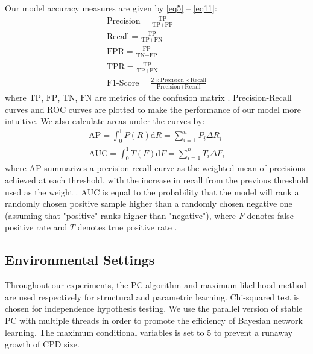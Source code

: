 \documentclass[journal,twoside]{IEEEtran}
\begin{document}
Our model accuracy measures are given by \eqref{eq5} -- \eqref{eq11}: 
\begin{gather}
    \text{Precision} = \displaystyle\frac{\text{TP}}{\text{TP} + \text{FP}}\label{eq5} \\
    \text{Recall} = \displaystyle\frac{\text{TP}}{\text{TP} + \text{FN}}\label{eq6} \\
    \text{FPR} = \displaystyle\frac{\text{FP}}{\text{TN} + \text{FP}}\label{eq7} \\
    \text{TPR} = \displaystyle\frac{\text{TP}}{\text{TP} + \text{FN}}\label{eq8} \\
    \text{F1-Score} = \displaystyle\frac{2 \times \text{Precision} \times \text{Recall}}{\text{Precision} + \text{Recall}}\label{eq9}
\end{gather}
where $\text{TP}$, $\text{FP}$, $\text{TN}$, $\text{FN}$ are metrics of the confusion matrix \cite{stehman1997selecting}. Precision-Recall curves and ROC curves \cite{powers2020evaluation}\cite{fawcett2006introduction} are plotted to make the performance of our model more intuitive. We also calculate areas under the curves by: 
\begin{gather}
    \text{AP} = \int_0^1 P(R)\text{d}R = \sum\limits_{i=1}^n P_i\Delta R_i\label{eq10} \\
    \text{AUC} = \int_0^1 T(F)\text{d}F = \sum\limits_{i=1}^n T_i\Delta F_i\label{eq11}
\end{gather}
where $\text{AP}$ summarizes a precision-recall curve as the weighted mean of precisions achieved at each threshold, with the increase in recall from the previous threshold used as the weight \cite{zhu2004recall}. $\text{AUC}$ is equal to the probability that the model will rank a randomly chosen positive sample higher than a randomly chosen negative one (assuming that "positive" ranks higher than "negative"), where $F$ denotes false positive rate and $T$ denotes true positive rate \cite{fawcett2006introduction}. 

\subsection{Environmental Settings}\label{3.3}

Throughout our experiments, the PC algorithm and maximum likelihood method are used respectively for structural and parametric learning. Chi-squared test is chosen for independence hypothesis testing. We use the parallel version of stable PC with multiple threads in order to promote the efficiency of Bayesian network learning. The maximum conditional variables is set to 5 to prevent a runaway growth of CPD size. 
\end{document}
